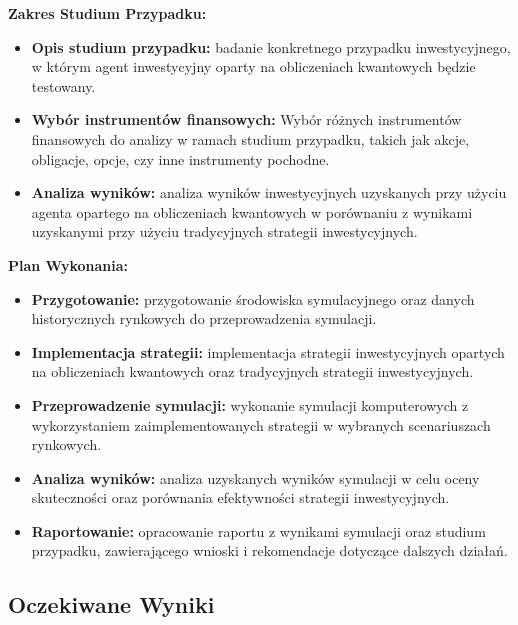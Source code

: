 \documentclass[polish,envcountsect,10pt]{article}
\begin{document}
\noindent\textbf{Zakres Studium Przypadku:}
\begin{itemize}
	\item \textbf{Opis studium przypadku:} badanie konkretnego przypadku inwestycyjnego, w którym agent inwestycyjny oparty na obliczeniach kwantowych będzie testowany.
    
	\item \textbf{Wybór instrumentów finansowych:} Wybór różnych instrumentów finansowych do analizy w ramach studium przypadku, takich jak akcje, obligacje, opcje, czy inne instrumenty pochodne.
    
	\item \textbf{Analiza wyników:} analiza wyników inwestycyjnych uzyskanych przy użyciu agenta opartego na obliczeniach kwantowych w porównaniu z wynikami uzyskanymi przy użyciu tradycyjnych strategii inwestycyjnych.
\end{itemize}

\noindent\textbf{Plan Wykonania:}
\begin{itemize}
	\item \textbf{Przygotowanie:} przygotowanie środowiska symulacyjnego oraz danych historycznych rynkowych do przeprowadzenia symulacji.
    
	\item \textbf{Implementacja strategii:} implementacja strategii inwestycyjnych opartych na obliczeniach kwantowych oraz tradycyjnych strategii inwestycyjnych.
    
	\item \textbf{Przeprowadzenie symulacji:} wykonanie symulacji komputerowych z wykorzystaniem zaimplementowanych strategii w wybranych scenariuszach rynkowych.
    
	\item \textbf{Analiza wyników:} analiza uzyskanych wyników symulacji w celu oceny skuteczności oraz porównania efektywności strategii inwestycyjnych.
    
	\item \textbf{Raportowanie:} opracowanie raportu z wynikami symulacji oraz studium przypadku, zawierającego wnioski i rekomendacje dotyczące dalszych działań.
\end{itemize}

\subsection{Oczekiwane Wyniki}
\end{document}

